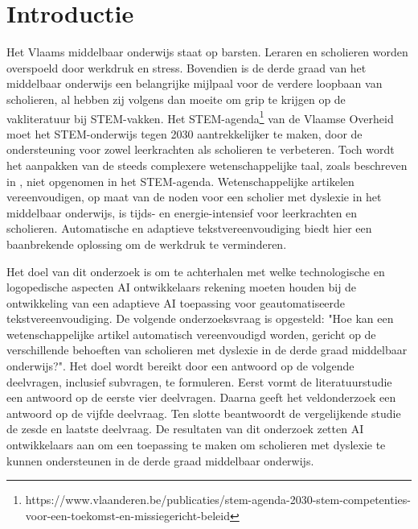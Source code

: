 
\section{Introductie}%
\label{sec:introductie}


Het Vlaams middelbaar onderwijs staat op barsten. Leraren en scholieren worden overspoeld door werkdruk en stress. Bovendien is de derde graad van het middelbaar onderwijs een belangrijke mijlpaal voor de verdere loopbaan van scholieren, al hebben zij volgens \textcite{Dapaah2022} dan moeite om grip te krijgen op de vakliteratuur bij STEM-vakken. Het STEM-agenda\footnote{https://www.vlaanderen.be/publicaties/stem-agenda-2030-stem-competenties-voor-een-toekomst-en-missiegericht-beleid} van de Vlaamse Overheid moet het STEM-onderwijs tegen 2030 aantrekkelijker te maken, door de ondersteuning voor zowel leerkrachten als scholieren te verbeteren. Toch wordt het aanpakken van de steeds complexere wetenschappelijke taal, zoals beschreven in \textcite{Barnett2020}, niet opgenomen in het STEM-agenda. Wetenschappelijke artikelen vereenvoudigen, op maat van de noden voor een scholier met dyslexie in het middelbaar onderwijs, is tijds- en energie-intensief voor leerkrachten en scholieren. Automatische en adaptieve tekstvereenvoudiging biedt hier een baanbrekende oplossing om de werkdruk te verminderen.

Het doel van dit onderzoek is om te achterhalen met welke technologische en logopedische aspecten AI ontwikkelaars rekening moeten houden bij de ontwikkeling van een adaptieve AI toepassing voor geautomatiseerde tekstvereenvoudiging. De volgende onderzoeksvraag is opgesteld: "Hoe kan een wetenschappelijke artikel automatisch vereenvoudigd worden, gericht op de verschillende behoeften van scholieren met dyslexie in de derde graad middelbaar onderwijs?". Het doel wordt bereikt door een antwoord op de volgende deelvragen, inclusief subvragen, te formuleren. Eerst vormt de literatuurstudie een antwoord op de eerste vier deelvragen. Daarna geeft het veldonderzoek een antwoord op de vijfde deelvraag. Ten slotte beantwoordt de vergelijkende studie de zesde en laatste deelvraag. De resultaten van dit onderzoek zetten AI ontwikkelaars aan om een toepassing te maken om scholieren met dyslexie te kunnen ondersteunen in de derde graad middelbaar onderwijs.

